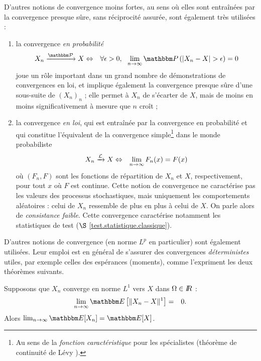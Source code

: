 D'autres notions de convergence moins fortes, au sens o\`u elles sont entra\^in\'ees par la convergence presque s\^ure, sans r\'eciprocit\'e assur\'ee,  sont \'egalement tr\`es utilis\'ees :
\begin{enumerate}
\item la convergence {\it en probabilit\'e} 
\begin{eqnarray*}
X_n \xrightarrow{{\cal{\Pm}}} X & \Leftrightarrow & \forall \epsilon >0, \ \ \lim\limits_{n\to\infty}\Pm\left(|X_n - X|>\epsilon\right) = 0 
\end{eqnarray*} 
joue un r\^ole important dans un grand nombre de d\'emonstrations de convergences en loi, et implique \'egalement la convergence presque s\^ure d'une sous-suite de $(X_n)_n$ ; elle permet \`a $X_n$ de s'\'ecarter de $X$, mais de moins en moins significativement \`a mesure que $n$ cro\^it ;

\item la convergence {\it en loi}, qui est entra\^in\'ee par la convergence en probabilit\'e et qui constitue l'\'equivalent de la convergence simp\-le\footnote{Au sens de la {\it fonction caract\'eristique} pour les sp\'ecialistes (th\'eor\`eme de continuit\'e de L\'evy \cite{Saporta2006}).} dans le monde probabiliste 
\begin{eqnarray*}
X_n \xrightarrow{{\cal{L}}} X & \Leftrightarrow & \lim\limits_{n\to\infty} F_n(x) = F(x)
\end{eqnarray*} 
o\`u $(F_n,F)$ sont les fonctions de r\'epartition de $X_n$ et $X$, respectivement, pour tout $x$ o\`u $F$ est continue. Cette notion de convergence ne caract\'erise pas les valeurs des processus stochastiques, mais uniquement les comportements al\'eatoires : celui de $X_n$ ressemble de plus en plus \`a celui de $X$. On parle alors de {\it consistance faible}\footnotemark[1]. Cette convergence caract\'erise notamment les statistiques de test ($\S$ \ref{test.statistique.classique}).
\end{enumerate}

D'autres notions de convergence (en norme $L^p$ en particulier) sont \'egalement utilis\'ees. Leur emploi est en g\'en\'eral de s'assurer des convergences {\it d\'eterministes} utiles, par exemple celles des esp\'erances (moments), comme l'expriment les deux th\'eor\`emes suivants. \\ 
 
\begin{theorem}
Supposons que $X_n$ converge en norme $L^1$ vers $X$ dans $\Omega\in I\!\!R$ :
\begin{eqnarray*}
\lim\limits_{n\to\infty} \E\left[\| X_n - X\|^1\right] & = & 0.
\end{eqnarray*}
Alors $\lim_{n\to\infty}\E[X_n]  =  \E[X]$. \\
\end{theorem}


